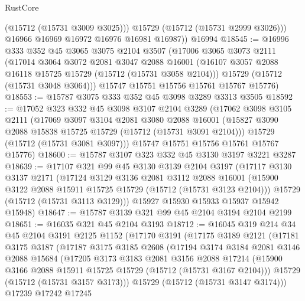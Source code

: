 \begin{lexlean}{RustCore}
\begin{coremodule}
            (@15712 (@15731 @3009 @3025)))
          @15729
          (@15712 (@15731 @2999 @3026)))
        @16966
        @16969
        @16972
        @16976
        @16981
        @16987))
    @16994
@18545 := @16996
    @333
    @352
    @45
    @3065
    @3075
    @2104
    @3507
    (@17006
      @3065
      @3073
      @2111
      (@17014
        @3064
        @3072
        @2081
        @3047
        @2088
        @16001
        (@16107 @3057 @2088 @16118 @15725 @15729 (@15712 (@15731 @3058 @2104)))
        @15729
        (@15712 (@15731 @3048 @3064)))
      @15747
      @15751
      @15756
      @15761
      @15767
      @15776)
@18553 := @15787 @3075 @333 @352 @45 @3098 @3289 @3313 @3505
@18592 := @17052
    @323
    @332
    @45
    @3098
    @3107
    @2104
    @3289
    (@17062
      @3098
      @3105
      @2111
      (@17069
        @3097
        @3104
        @2081
        @3080
        @2088
        @16001
        (@15827 @3090 @2088 @15838 @15725 @15729 (@15712 (@15731 @3091 @2104)))
        @15729
        (@15712 (@15731 @3081 @3097)))
      @15747
      @15751
      @15756
      @15761
      @15767
      @15776)
@18600 := @15787 @3107 @323 @332 @45 @3130 @3197 @3221 @3287
@18639 := @17107
    @321
    @99
    @45
    @3130
    @3139
    @2104
    @3197
    (@17117
      @3130
      @3137
      @2171
      (@17124
        @3129
        @3136
        @2081
        @3112
        @2088
        @16001
        (@15900 @3122 @2088 @15911 @15725 @15729 (@15712 (@15731 @3123 @2104)))
        @15729
        (@15712 (@15731 @3113 @3129)))
      @15927
      @15930
      @15933
      @15937
      @15942
      @15948)
@18647 := @15787 @3139 @321 @99 @45 @2104 @3194 @2104 @2199
@18651 := @16035 @321 @45 @2104 @3193
@18712 := @16045
    @319
    @214
    @34
    @45
    @2104
    @3191
    @2125
    @1152
    (@17170
      @3191
      (@17175
        @3189
        @2121
        (@17181
          @3175
          @3187
          (@17187
            @3175
            @3185
            @2608
            (@17194
              @3174
              @3184
              @2081
              @3146
              @2088
              @15684
              (@17205
                @3173
                @3183
                @2081
                @3156
                @2088
                @17214
                (@15900 @3166 @2088 @15911 @15725 @15729 (@15712 (@15731 @3167 @2104)))
                @15729
                (@15712 (@15731 @3157 @3173)))
              @15729
              (@15712 (@15731 @3147 @3174)))
            @17239
            @17242
            @17245

\end{coremodule}
\end{lexlean}
